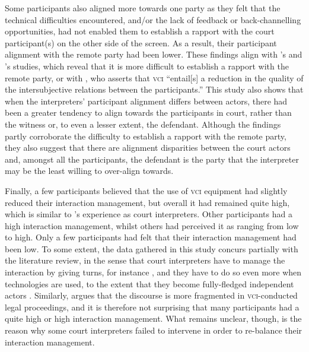 \documentclass[output=paper]{langsci/langscibook}
\begin{document}
Some participants also aligned more towards one party as they felt that the technical difficulties encountered, and/or the lack of feedback or back-channelling opportunities, had not enabled them to establish a rapport with the court participant(s) on the other side of the screen. As a result, their participant alignment with the remote party had been lower. These findings align with \citet{Rombouts2011}’s and \citet{Napier2011}’s studies, which reveal that it is more difficult to establish a rapport with the remote party, or with \citep[4]{Braun2016b}, who asserts that \textsc{vci} “entail[s] a reduction in the quality of the intersubjective relations between the participants.” This study also shows that when the interpreters’ participant alignment differs between actors, there had been a greater tendency to align towards the participants in court, rather than the witness or, to even a lesser extent, the defendant. Although the findings partly corroborate the difficulty to establish a rapport with the remote party, they also suggest that there are alignment disparities between the court actors and, amongst all the participants, the defendant is the party that the interpreter may be the least willing to over-align towards.

Finally, a few participants believed that the use of \textsc{vci} equipment had slightly reduced their interaction management, but overall it had remained quite high, which is similar to \citet{Llewellyn-Jones2014}’s experience as court interpreters. Other participants had a high interaction management, whilst others had perceived it as ranging from low to high. Only a few participants had felt that their interaction management had been low. To some extent, the data gathered in this study concurs partially with the literature review, in the sense that court interpreters have to manage the interaction by giving turns, for instance \citep{Angelelli2003,Llewellyn-Jones2014,Martin2008}, and they have to do so even more when technologies are used, to the extent that they become fully-fledged independent actors \citep{Lee2007,Rosenberg2007}. Similarly, \citet{Braun2016a} argues that the discourse is more fragmented in \textsc{vci}-conducted legal proceedings, and it is therefore not surprising that many participants had a quite high or high interaction management. What remains unclear, though, is the reason why some court interpreters failed to intervene in order to re-balance their interaction management. 
\end{document}
